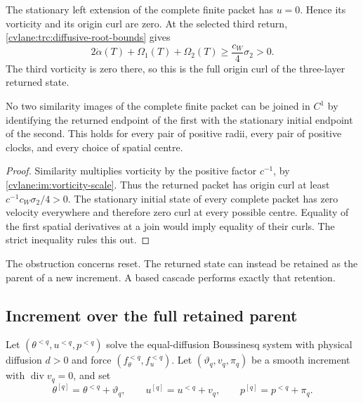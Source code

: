The stationary left extension of the complete finite packet has $u=0$.
Hence its vorticity and its origin curl are zero.  At the selected third
return, \eqref{cvlane:trc:diffusive-root-bounds} gives
\begin{equation}\label{cvlane:ibc:positive-output-curl}
 2\dot\alpha(T)+\Omega_1(T)+\Omega_2(T)
 \geq \frac{c_W}{4}\sigma_2>0.
\end{equation}
The third vorticity is zero there, so this is the full origin curl of the
three-layer returned state.

\begin{cvlaneproposition}\label{cvlane:ibc:reset-obstruction}
No two similarity images of the complete finite packet can be joined in
$C^1$ by identifying the returned endpoint of the first with the stationary
initial endpoint of the second.  This holds for every pair of positive radii,
every pair of positive clocks, and every choice of spatial centre.
\end{cvlaneproposition}

\begin{proof}
Similarity multiplies vorticity by the positive factor $c^{-1}$, by
\eqref{cvlane:im:vorticity-scale}.  Thus the returned packet has origin curl at
least $c^{-1}c_W\sigma_2/4>0$.  The stationary initial state of every
complete packet has zero velocity everywhere and therefore zero curl at
every possible centre.  Equality of the first spatial derivatives at a join
would imply equality of their curls.  The strict inequality rules this out.
\end{proof}

The obstruction concerns reset.  The returned state can instead be retained
as the parent of a new increment.  A based cascade performs exactly that
retention.

\subsection{Increment over the full retained parent}

Let $(\theta^{<q},u^{<q},p^{<q})$ solve the equal-diffusion Boussinesq
system with physical diffusion $d>0$ and force
$(f_\theta^{<q},f_u^{<q})$.  Let
$(\vartheta_q,v_q,\pi_q)$ be a smooth increment with
$\operatorname{div}v_q=0$, and set
\begin{equation}\label{cvlane:ibc:cumulative-state}
 \theta^{[q]}=\theta^{<q}+\vartheta_q,\qquad
 u^{[q]}=u^{<q}+v_q,\qquad
 p^{[q]}=p^{<q}+\pi_q.
\end{equation}

